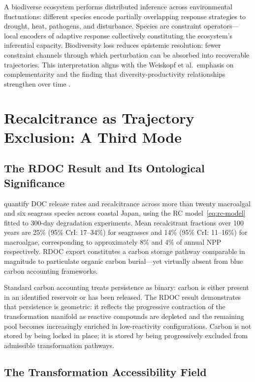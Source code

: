 \documentclass[12pt]{article}
\begin{document}
A biodiverse ecosystem performs distributed inference across environmental fluctuations:
different species encode partially overlapping response strategies to drought, heat,
pathogens, and disturbance. Species are constraint operators---local encoders of adaptive
response collectively constituting the ecosystem's inferential capacity. Biodiversity loss
reduces epistemic resolution: fewer constraint channels through which perturbation can be
absorbed into recoverable trajectories. This interpretation aligns with the
Weiskopf et al.\ emphasis on complementarity and the finding that diversity-productivity
relationships strengthen over time \citep{Reich2012,Wang2016}.

\section{Recalcitrance as Trajectory Exclusion: A Third Mode}

\subsection{The RDOC Result and Its Ontological Significance}

\citet{Watanabe2026} quantify DOC release rates and recalcitrance across more than twenty
macroalgal and six seagrass species across coastal Japan, using the RC
model~\eqref{eq:rc-model} fitted to 300-day degradation experiments. Mean recalcitrant
fractions over 100 years are 25\% (95\% CrI: 17--34\%) for seagrasses and 14\%
(95\% CrI: 11--16\%) for macroalgae, corresponding to approximately 8\% and 4\% of
annual NPP respectively. RDOC export constitutes a carbon storage pathway comparable in
magnitude to particulate organic carbon burial---yet virtually absent from blue carbon
accounting frameworks.

Standard carbon accounting treats persistence as binary: carbon is either present in an
identified reservoir or has been released. The RDOC result demonstrates that persistence
is geometric: it reflects the progressive contraction of the transformation manifold as
reactive compounds are depleted and the remaining pool becomes increasingly enriched in
low-reactivity configurations. Carbon is not stored by being locked in place; it is stored
by being progressively excluded from admissible transformation pathways.

\subsection{The Transformation Accessibility Field}
\end{document}
